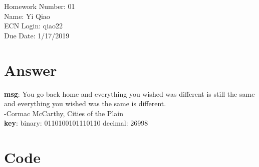 \documentclass[11pt]{article}
\begin{document}
\noindent Homework Number: 01\\
Name: Yi Qiao\\
ECN Login: qiao22\\
Due Date: 1/17/2019\\
\section*{Answer}
\noindent \textbf{msg}: You go back home and everything you wished was different is still the same and everything you wished was the same is different.\\

\noindent -Cormac McCarthy, Cities of the Plain\\

\noindent \textbf{key}: binary:  0110100101110110 decimal: 26998\\
\section*{Code}
\inputminted{python}{cryptBreak.py}
\end{document}
